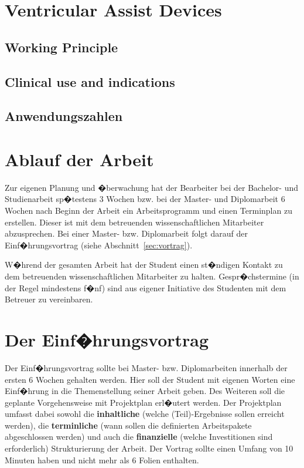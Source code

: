 \cite{Misgeld2016}

\section{Ventricular Assist Devices}
\subsection{Working Principle}
\cite{Schwandtner2016}

\subsection{Clinical use and indications}

\subsection{Anwendungszahlen}


\section{Ablauf der Arbeit}
Zur eigenen Planung und �berwachung hat der Bearbeiter bei der Bachelor- und Studienarbeit sp�testens 3 Wochen
bzw. bei der Master- und Diplomarbeit 6 Wochen nach Beginn der Arbeit ein Arbeitsprogramm und einen Terminplan
zu erstellen. Dieser ist mit dem betreuenden wissenschaftlichen Mitarbeiter abzusprechen. Bei einer
Master- bzw. Diplomarbeit folgt darauf der Einf�hrungsvortrag (siehe Abschnitt~\ref{sec:vortrag}).

W�hrend der gesamten Arbeit hat der Student einen st�ndigen Kontakt zu dem betreuenden
wissenschaftlichen Mitarbeiter zu halten. Gespr�chstermine (in der Regel mindestens f�nf) sind
aus eigener Initiative des Studenten mit dem Betreuer zu vereinbaren.

\section{Der Einf�hrungsvortrag\label{sec:vortrag}}
Der Einf�hrungsvortrag sollte bei Master- bzw. Diplomarbeiten innerhalb der ersten 6 Wochen gehalten werden. Hier soll der Student
mit eigenen Worten eine Einf�hrung in die Themenstellung seiner Arbeit geben. Des Weiteren
soll die geplante Vorgehensweise mit Projektplan erl�utert werden. Der Projektplan umfasst dabei
sowohl die \textbf{inhaltliche} (welche (Teil)-Ergebnisse sollen erreicht werden), die
\textbf{terminliche} (wann sollen die definierten Arbeitspakete abgeschlossen werden) und auch die
\textbf{finanzielle} (welche Investitionen sind erforderlich) Strukturierung der Arbeit. Der
Vortrag sollte einen Umfang von 10 Minuten haben und nicht mehr als 6 Folien enthalten.

